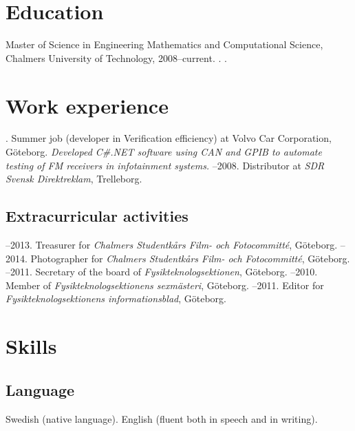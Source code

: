 \documentclass{skvitae}
\author{Simon Sigurdhsson}
\affiliation{}
\begin{document}
	\RaggedRight
	\maketitle


	\section{Education}
	\ind Master of Science in Engineering Mathematics and Computational Science, Chalmers University of Technology, 2008--current.%
	.%
	.

	\section{Work experience}
	. Summer job (developer in Verification efficiency) at Volvo Car Corporation, Göteborg. %
	    \textit{Developed C\#.NET software using CAN and GPIB to automate testing of FM receivers in infotainment systems.}
	--2008. Distributor at \emph{SDR Svensk Direktreklam}, Trelleborg.

	\medskip
	\subsection{Extracurricular activities}
	--2013. Treasurer for \emph{Chalmers Studentkårs Film- och Fotocommitté}, Göteborg.
	--2014. Photographer for \emph{Chalmers Studentkårs Film- och Fotocommitté}, Göteborg.
	--2011. Secretary of the board of \emph{Fysikteknologsektionen}, Göteborg.
	--2010. Member of \emph{Fysikteknologsektionens sexmästeri}, Göteborg.
	--2011. Editor for \emph{Fysikteknologsektionens informationsblad}, Göteborg.

	\section{Skills}
	\subsection{Language}
	\ind Swedish (native language).
	\ind English (fluent both in speech and in writing).
\end{document}
